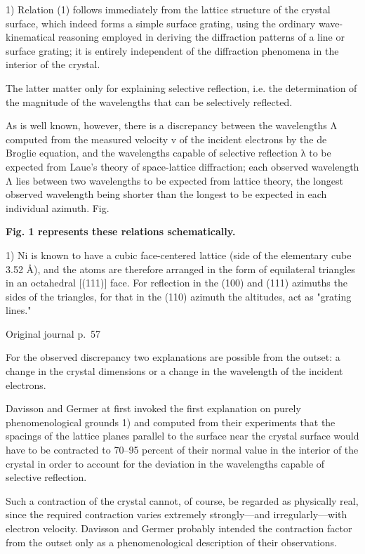 \documentclass[10pt]{article}
\newcommand{\origpage}[1]{\par\medskip\noindent\hfill{\small\color{notegray}Original journal p.~#1}\hfill\mbox{}\par\smallskip}
\begin{document}
\noindent\footnotesize 1) Relation (1) follows immediately from the lattice structure of the crystal surface, which indeed forms a simple surface grating, using the ordinary wave-kinematical reasoning employed in deriving the diffraction patterns of a line or surface grating; it is entirely independent of the diffraction phenomena in the interior of the crystal.\par\normalsize
The latter matter only for explaining selective reflection, i.e. the determination of the magnitude of the wavelengths that can be selectively reflected.\par
As is well known, however, there is a discrepancy between the wavelengths Λ computed from the measured velocity v of the incident electrons by the de Broglie equation, and the wavelengths capable of selective reflection λ to be expected from Laue's theory of space-lattice diffraction; each observed wavelength Λ lies between two wavelengths to be expected from lattice theory, the longest observed wavelength being shorter than the longest to be expected in each individual azimuth. Fig.\par
\noindent\textbf{Fig. 1 represents these relations schematically.}\par
\noindent\footnotesize 1) Ni is known to have a cubic face-centered lattice (side of the elementary cube 3.52 Å), and the atoms are therefore arranged in the form of equilateral triangles in an octahedral [(111)] face. For reflection in the (100) and (111) azimuths the sides of the triangles, for that in the (110) azimuth the altitudes, act as "grating lines."\par\normalsize
\origpage{57}
For the observed discrepancy two explanations are possible from the outset: a change in the crystal dimensions or a change in the wavelength of the incident electrons.\par
Davisson and Germer at first invoked the first explanation on purely phenomenological grounds 1) and computed from their experiments that the spacings of the lattice planes parallel to the surface near the crystal surface would have to be contracted to 70–95 percent of their normal value in the interior of the crystal in order to account for the deviation in the wavelengths capable of selective reflection.\par
Such a contraction of the crystal cannot, of course, be regarded as physically real, since the required contraction varies extremely strongly—and irregularly—with electron velocity. Davisson and Germer probably intended the contraction factor from the outset only as a phenomenological description of their observations.\par
\end{document}
